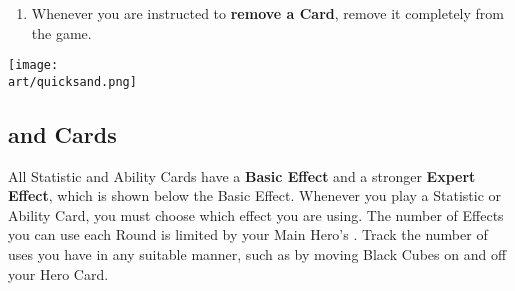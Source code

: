 \begin{multicols}{2}
\begin{enumerate}
  \begin{itemize}
    \item \textbf{Instant}  Effects are resolved immediately.
    \item \textbf{Activation}  Effects must be played when Activating your own Unit in Combat.
    \item \textbf{Map}  Effects cannot be used during Combat.
    \item \textbf{Ongoing}  Effects last until they are used up or until the player who played them starts their next Turn (whichever happens first).
      \begin{expansion}[before skip balanced=0.3em,]{stronghold,conflux,cove}
      \parbox{0.75\hsize}{You can use Time Tokens to track the duration of Ongoing Effects.}
      \end{expansion}
    \item \textbf{Permanent}  Cards stay in play until discarded or replaced.
      They are played the same way as  and  Cards.
      \textbf{You may only have one permanent Card at a time}; playing another discards the first.
      While a Permanent Card is in play, you may use either its Basic or Expert Effect, but not both simultaneously.
  \end{itemize}
  \item Whenever you are instructed to \textbf{remove a Card}, remove it completely from the game.
\end{enumerate}

\vfill
\hfill{\texttt{[image: \\art/quicksand.png]}}

\clearpage

\subsection*{ and  Cards}

All Statistic and Ability Cards have a \textbf{Basic Effect} and a stronger \textbf{Expert}  \textbf{Effect}, which is shown below the Basic Effect.
Whenever you play a Statistic or Ability Card, you must choose which effect you are using.
The number of  Effects you can use each Round is limited by your Main Hero's .
Track the number of uses you have in any suitable manner, such as by moving Black Cubes on and off your Hero Card.\par


\end{multicols}

